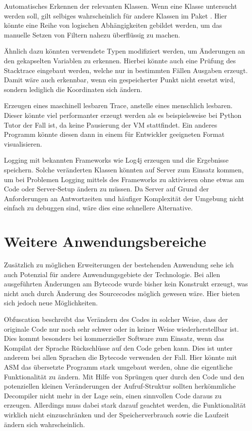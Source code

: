 Automatisches Erkennen der relevanten Klassen. Wenn eine Klasse  untersucht werden soll, gilt selbiges wahrscheinlich für andere Klassen im Paket . Hier könnte eine Reihe von logischen Abhängigkeiten gebildet werden, um das manuelle Setzen von Filtern nahezu überflüssig zu machen.

Ähnlich dazu könnten verwendete Typen modifiziert werden, um Änderungen an den gekapselten Variablen zu erkennen. Hierbei könnte auch eine Prüfung des Stacktrace eingebaut werden, welche nur in bestimmten Fällen Ausgaben erzeugt. Damit wäre auch erkennbar, wenn ein gespeicherter Punkt nicht ersetzt wird, sondern lediglich die Koordinaten sich ändern.

Erzeugen eines maschinell lesbaren Trace, anstelle eines menschlich lesbaren. Dieser könnte viel performanter erzeugt werden als es beispielsweise bei Python Tutor der Fall ist, da keine Pausierung der \ac{VM} stattfindet. Ein anderes Programm könnte diesen dann in einem für Entwickler geeigneten Format visualisieren.

Logging mit bekannten Frameworks wie Log4j erzeugen und die Ergebnisse speichern. Solche veränderten Klassen könnten auf Server zum Einsatz kommen, um bei Problemen Logging mittels des Frameworks zu aktivieren ohne etwas am Code oder Server-Setup ändern zu müssen. Da Server auf Grund der Anforderungen an Antwortzeiten und häufiger Komplexität der Umgebung nicht einfach zu debuggen sind, wäre dies eine schnellere Alternative.

\section{Weitere Anwendungsbereiche} 

Zusätzlich zu möglichen Erweiterungen der bestehenden Anwendung sehe ich auch Potenzial für andere Anwendungsgebiete der Technologie. Bei allen ausgeführten Änderungen am Bytecode wurde bisher kein Konstrukt erzeugt, was nicht auch durch Änderung des Sourcecodes möglich gewesen wäre. Hier bieten sich jedoch neue Möglichkeiten.

Obfuscation beschreibt das Verändern des Codes in solcher Weise, dass der originale Code nur noch sehr schwer oder in keiner Weise wiederherstellbar ist. Dies kommt besonders bei kommerzieller Software zum Einsatz, wenn das Kompilat der Sprache Rückschlüsse auf den Code geben kann. Dies ist unter anderem bei allen Sprachen die Bytecode verwenden der Fall.
Hier könnte mit ASM das übersetzte Programm stark umgebaut werden, ohne die eigentliche Funktionalität zu ändern. Mit Hilfe von Sprüngen quer durch den Code und den potenziellen kleinen Veränderungen der Aufruf-Struktur sollten herkömmliche Decompiler nicht mehr in der Lage sein, einen sinnvollen Code daraus zu erzeugen. Allerdings muss dabei stark darauf geachtet werden, die Funktionalität wirklich nicht einzuschränken und der Speicherverbrauch sowie die Laufzeit ändern sich wahrscheinlich.

